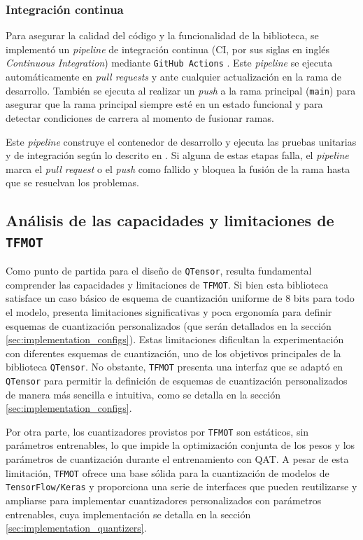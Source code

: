 \subsubsection{Integración continua}
\label{sec:integracion_continua}
Para asegurar la calidad del código y la funcionalidad de la biblioteca, se implementó un \textit{pipeline} de integración continua (CI, por sus siglas en inglés \textit{Continuous Integration}) \cite{fowler2006ci} mediante \texttt{GitHub Actions} \cite{github_actions}. Este \textit{pipeline} se ejecuta automáticamente en \textit{pull requests} y ante cualquier actualización en la rama de desarrollo. También se ejecuta al realizar un \textit{push} a la rama principal (\texttt{main}) para asegurar que la rama principal siempre esté en un estado funcional y para detectar condiciones de carrera al momento de fusionar ramas.

Este \textit{pipeline} construye el contenedor de desarrollo y ejecuta las pruebas unitarias y de integración según lo descrito en \cite{qtensor_github_action}. Si alguna de estas etapas falla, el \textit{pipeline} marca el \textit{pull request} o el \textit{push} como fallido y bloquea la fusión de la rama hasta que se resuelvan los problemas.

\subsection{Análisis de las capacidades y limitaciones de \texttt{TFMOT}}
\label{sec:analisis_tfmot}
Como punto de partida para el diseño de \texttt{QTensor}, resulta fundamental comprender las capacidades y limitaciones de \texttt{TFMOT}. Si bien esta biblioteca satisface un caso básico de esquema de cuantización uniforme de 8 bits para todo el modelo, presenta limitaciones significativas y poca ergonomía para definir esquemas de cuantización personalizados (que serán detallados en la sección \ref{sec:implementation_configs}). Estas limitaciones dificultan la experimentación con diferentes esquemas de cuantización, uno de los objetivos principales de la biblioteca \texttt{QTensor}. No obstante, \texttt{TFMOT} presenta una interfaz que se adaptó en \texttt{QTensor} para permitir la definición de esquemas de cuantización personalizados de manera más sencilla e intuitiva, como se detalla en la sección \ref{sec:implementation_configs}.

Por otra parte, los cuantizadores provistos por \texttt{TFMOT} son estáticos, sin parámetros entrenables, lo que impide la optimización conjunta de los pesos y los parámetros de cuantización durante el entrenamiento con QAT. A pesar de esta limitación, \texttt{TFMOT} ofrece una base sólida para la cuantización de modelos de \texttt{TensorFlow/Keras} y proporciona una serie de interfaces que pueden reutilizarse y ampliarse para implementar cuantizadores personalizados con parámetros entrenables, cuya implementación se detalla en la sección \ref{sec:implementation_quantizers}.

